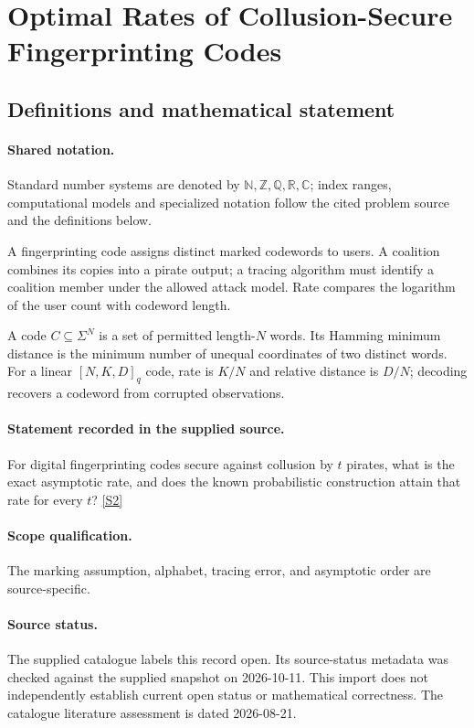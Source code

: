 \documentclass[11pt]{article}
\newcommand{\sref}[2]{\hyperlink{source:#1:#2}{[S#2]}}
\begin{document}
\section{Optimal Rates of Collusion-Secure Fingerprinting Codes}\label{statement}

\subsection{Definitions and mathematical statement}

\paragraph{Shared notation.}Standard number systems are denoted by $\mathbb N,\mathbb Z,\mathbb Q,\mathbb R,\mathbb C$; index ranges, computational models and specialized notation follow the cited problem source and the definitions below.


A fingerprinting code assigns distinct marked codewords to users. A coalition combines its copies into a pirate output; a tracing algorithm must identify a coalition member under the allowed attack model. Rate compares the logarithm of the user count with codeword length.

A code $C\subseteq\Sigma^N$ is a set of permitted length-$N$ words. Its Hamming minimum distance is the minimum number of unequal coordinates of two distinct words. For a linear $[N,K,D]_q$ code, rate is $K/N$ and relative distance is $D/N$; decoding recovers a codeword from corrupted observations.
\paragraph{Statement recorded in the supplied source.}
For digital fingerprinting codes secure against collusion by $t$ pirates, what is the exact asymptotic rate, and does the known probabilistic construction attain that rate for every $t$? \sref{statement}{2}
\paragraph{Scope qualification.}
The marking assumption, alphabet, tracing error, and asymptotic order are source-specific.
\paragraph{Source status.}
The supplied catalogue labels this record open. Its source-status metadata was checked against the supplied snapshot on 2026-10-11. This import does not independently establish current open status or mathematical correctness. The catalogue literature assessment is dated 2026-08-21.
\end{document}
